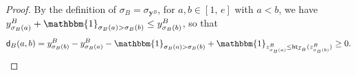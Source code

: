 \documentclass[11pt,a4paper,reqno]{amsart}
\numberwithin{equation}{section}
\theoremstyle{plain}
\newtheorem{lem}[thm]{Lemma}
\theoremstyle{definition}
\theoremstyle{remark}
\numberwithin{equation}{section}
\newcommand{\bone}{\boldsymbol{1}}
\newcommand{\bbone}{\mathbbm{1}}
\newcommand{\br}{\mathbf{r}}
\newcommand{\by}{\mathbf{y}}
\newcommand{\bz}{\mathbf{z}}
\newcommand{\mv}{\mathbf{mv}}
\renewcommand{\min}{\mathrm{min}}
\newcommand{\ZZ}{\mathbb{Z}}
\newcommand{\HH}{\mathcal{H}}
\newcommand{\rr}{\rho}
\newcommand{\Be}{\mathbf{e}}
\newcommand{\EW}{\widehat{\mathbf{W}}}
\newcommand{\AAbar}{\overline{\mathcal{A}}_e^{\ell}}
\newcommand{\Ht}{\mathsf{ht}}
\newcommand{\II}{\mathcal{I}}
\newcommand{\dd}{\mathsf{d}}
\begin{document}
\begin{proof}
By the definition of $\sigma_B = \sigma_{\by^B}$, for $a,b \in [1,\,e]$ with $a < b$, we have $ y^B_{\sigma_B(a)} + \bbone_{\sigma_B(a) > \sigma_B(b)} \leq y^B_{\sigma_B(b)}$, so that
 $$\dd_B(a,b) = y^B_{\sigma_B(b)} - y^B_{\sigma_B(a)} - \bbone_{\sigma_B(a) > \sigma_B(b)}  + \bbone_{z^B_{\sigma_B(a)} \leq \Ht_{\II_B}(z^B_{\sigma_B(b)})} \geq 0.$$
\end{proof}

\end{document}
